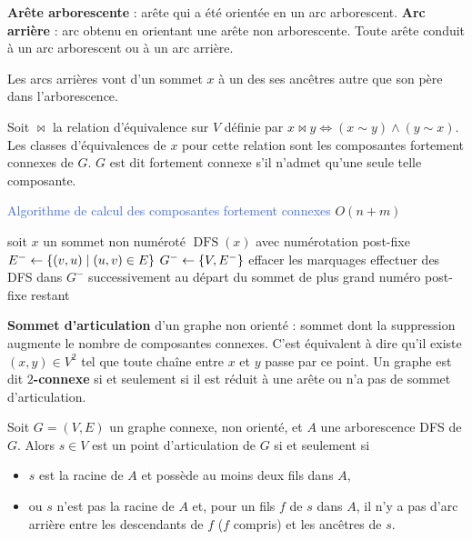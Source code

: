 \documentclass[a4paper,10pt,twocolumn]{article}
\DeclareMathOperator{\DFS}{DFS}
\begin{document}
	\begin{defn}
	\textbf{Arête arborescente} : arête qui a été orientée en un arc arborescent.
	\textbf{Arc arrière} : arc obtenu en orientant une arête non arborescente.
	Toute arête conduit à un arc arborescent ou à un arc arrière.
	\end{defn}

	\begin{lem}
	Les arcs arrières vont d'un sommet $x$ à un des ses ancêtres autre que son père dans l'arborescence.
	\end{lem}

	\begin{defn}
	Soit $\Join$ la relation d'équivalence sur $V$ définie par $x \Join y \iff (x \sim y) \wedge (y \sim x)$.
	Les classes d'équivalences de $x$ pour cette relation sont les composantes fortement connexes de $G$.
	$G$ est dit fortement connexe s'il n'admet qu'une seule telle composante.
	\end{defn}

	\begin{algorithm}
	\caption{\textcolor{RoyalBlue}{Algorithme de calcul des composantes fortement connexes} $O(n + m)$}
	{
		soit $x$ un sommet non numéroté \;
		$\DFS(x)$ avec numérotation post-fixe \;
	}
	$E^- \leftarrow \{ (v,u) \mid (u,v) \in E \}$ \;
	$G^- \leftarrow \{ V,E^- \}$ \;
	effacer les marquages \;
	effectuer des DFS dans $G^-$ successivement au départ du sommet de plus grand numéro post-fixe restant
	\end{algorithm}

	\begin{defn}
	\textbf{Sommet d'articulation} d'un graphe non orienté : sommet dont la suppression augmente le nombre de composantes connexes.
	C'est équivalent à dire qu'il existe $(x,y) \in V^2$ tel que toute chaîne entre $x$ et $y$ passe par ce point.
	Un graphe est dit \textbf{$2$-connexe} si et seulement si il est réduit à une arête ou n'a pas de sommet d'articulation.
	\end{defn}

	\begin{thm}
	Soit $G = (V,E)$ un graphe connexe, non orienté, et $A$ une arborescence DFS de $G$.
	Alors $s \in V$ est un point d'articulation de $G$ si et seulement si
		\begin{itemize}
		\item $s$ est la racine de $A$ et possède au moins deux fils dans $A$,
		\item ou $s$ n'est pas la racine de $A$ et, pour un fils $f$ de $s$ dans $A$, il n'y a pas d'arc arrière entre les descendants de $f$ ($f$ compris) et les ancêtres de $s$.
		\end{itemize}
	\end{thm}
\end{document}
